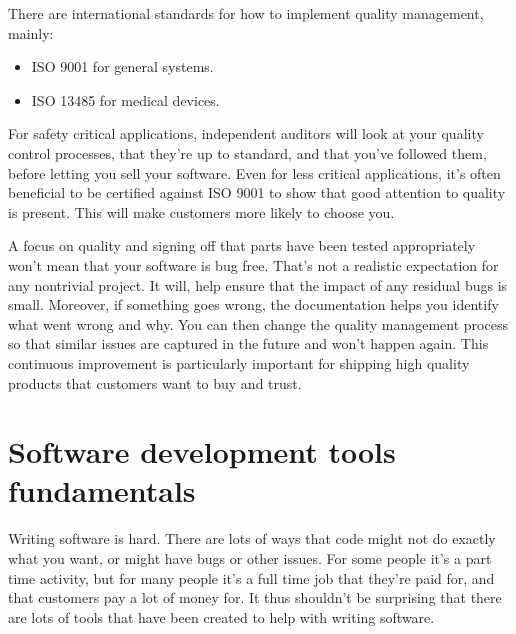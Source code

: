 \documentclass[letterpaper,10pt,british]{sphinxmanual}
\begin{document}
\sphinxAtStartPar
There are international standards for how to implement quality management, mainly:
\begin{itemize}
\item {} 
\sphinxAtStartPar
ISO 9001 for general systems.

\item {} 
\sphinxAtStartPar
ISO 13485 for medical devices.

\end{itemize}

\sphinxAtStartPar
For safety critical applications, independent auditors will look at your quality control processes, that they’re up to standard, and that you’ve followed them, before letting you sell your software. Even for less critical applications, it’s often beneficial to be certified against ISO 9001 to show that good attention to quality is present. This will make customers more likely to choose you.

\sphinxAtStartPar
A focus on quality and signing off that parts have been tested appropriately won’t mean that your software is bug free. That’s not a realistic expectation for any non\sphinxhyphen{}trivial project. It will, help ensure that the impact of any residual bugs is small. Moreover, if something goes wrong, the documentation helps you identify what went wrong and why. You can then change the quality management process so that similar issues are captured in the future and won’t happen again. This continuous improvement is particularly important for shipping high quality products that customers want to buy and trust.

\sphinxstepscope


\chapter{Software development tools fundamentals}
\label{\detokenize{chapters/software_development_tools:software-development-tools-fundamentals}}\label{\detokenize{chapters/software_development_tools:software-tools}}\label{\detokenize{chapters/software_development_tools::doc}}
\sphinxAtStartPar
Writing software is hard. There are lots of ways that code might not do exactly what you want, or might have bugs or other issues. For some people it’s a part time activity, but for many people it’s a full time job that they’re paid for, and that customers pay a lot of money for. It thus shouldn’t be surprising that there are lots of tools that have been created to help with writing software.
\end{document}

